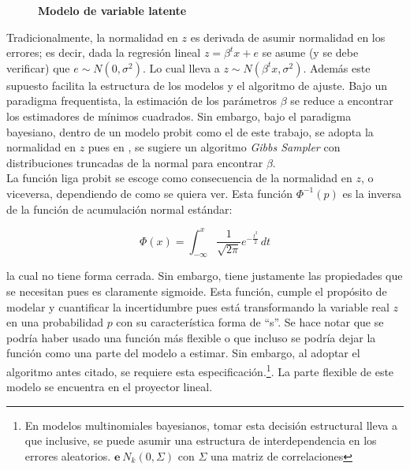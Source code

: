 \documentclass[../Main/Main.tex]{subfiles}
\begin{document}
\begin{figure}[h]
\centering
{}
\caption{\textbf{Modelo de variable latente}}
\label{fig:DiagramaVar}
\end{figure}

Tradicionalmente, la normalidad en $z$ es derivada de asumir normalidad en los errores; es decir, dada la regresión lineal $z = \beta^tx + e$ se asume (y se debe verificar) que $e \sim N(0,\sigma^2)$. Lo cual lleva a $z \sim N(\beta^tx,\sigma^2)$. Además este supuesto facilita la estructura de los modelos y el algoritmo de ajuste. Bajo un paradigma frequentista, la estimación de los parámetros $\beta$ se reduce a encontrar los estimadores de mínimos cuadrados. Sin embargo, bajo el paradigma bayesiano, dentro de un modelo probit como el de este trabajo, se adopta la normalidad en $z$ pues en  \autocite{albert1993bayesian}, se sugiere un algoritmo \textit{Gibbs Sampler} con distribuciones truncadas de la normal para encontrar $\beta$.\\

La función liga probit se escoge como consecuencia de la normalidad en $z$, o viceversa, dependiendo de como se quiera ver. Esta función $\Phi^{-1}(p)$ es la inversa de la función de acumulación normal estándar:

$$\Phi(x) = \int_{-\infty}^x \dfrac{1}{\sqrt{2\pi}}e^{-\frac{t^2}{2}}\, dt$$

la cual no tiene forma cerrada. Sin embargo, tiene justamente las propiedades que se necesitan pues es claramente sigmoide. Esta función, cumple el propósito de modelar y cuantificar la incertidumbre pues está transformando la variable real $z$ en una probabilidad $p$ con su característica forma de ``s''. Se hace notar que se podría haber usado una función más flexible o que incluso se podría dejar la función como una parte del modelo a estimar. Sin embargo, al adoptar el algoritmo antes citado, se requiere esta especificación.\footnote{En modelos multinomiales bayesianos, tomar esta decisión estructural lleva a que inclusive, se puede asumir una estructura de interdependencia en los errores aleatorios. $\mathbf{e} ~ N_k(0, \Sigma)$ con $\Sigma$ una matriz de correlaciones}. La parte flexible de este modelo se encuentra en el proyector lineal. \\
\end{document}
